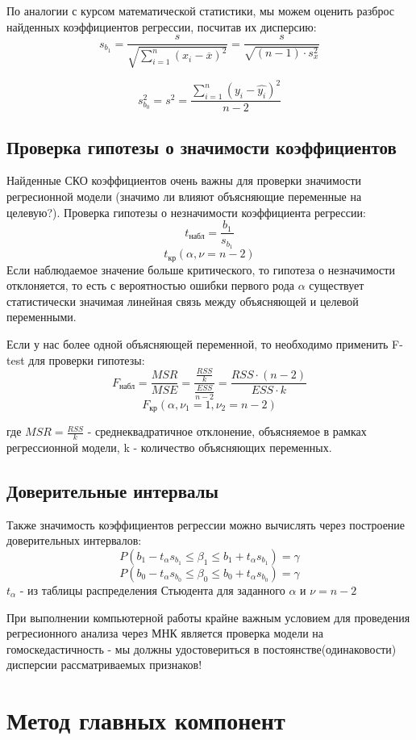 \documentclass[a4paper,12pt]{article} %
\begin{document}
По аналогии с курсом математической статистики, мы можем оценить разброс найденных коэффициентов регрессии, посчитав их дисперсию:
\[s_{b_1}=\frac{s}{\sqrt{\sum\limits_{i=1}^n (x_i-\overline{x})^2}} = \frac{s}{\sqrt{(n-1)\cdot s_x^2}}\]

\[s_{b_0}^2=s^2=\frac{\sum\limits_{i=1}^n (y_i-\hat{y_i})^2}{n-2}\]

\subsection{Проверка гипотезы о значимости коэффициентов}
Найденные СКО коэффициентов очень важны для проверки значимости регресионной модели (значимо ли влияют объясняющие переменные на целевую?). Проверка гипотезы о незначимости коэффициента регрессии:
\[t_{\text{набл}}=\frac{b_1}{s_{b_1}}\]
\[t_{\text{кр}}(\alpha, \nu=n-2)\]
Если наблюдаемое значение больше критического, то гипотеза о незначимости отклоняется, то есть с вероятностью ошибки первого рода $\alpha$ существует статистически значимая линейная связь между объясняющей и целевой переменными.

Если у нас более одной объясняющей переменной, то необходимо применить F-test для проверки гипотезы:
\[F_{\text{набл}}=\frac{MSR}{MSE}=\frac{\frac{RSS}{k}}{\frac{ESS}{n-2}}=\frac{RSS \cdot (n-2)}{ESS \cdot k}\]
\[F_{\text{кр}}(\alpha, \nu_1=1, \nu_2=n-2)\]

где $MSR=\frac{RSS}{k}$ - среднеквадратичное отклонение, объясняемое в рамках регрессионной модели, k - количество объясняющих переменных.

\subsection{Доверительные интервалы}

Также значимость коэффициентов регрессии можно вычислять через построение доверительных интервалов:
\[P(b_1-t_{\alpha}s_{b_1}\le \beta_1 \le b_1+t_{\alpha}s_{b_1})=\gamma\]
\[P(b_0-t_{\alpha}s_{b_0}\le \beta_0 \le b_0+t_{\alpha}s_{b_0})=\gamma\]
$t_{\alpha}$ - из таблицы распределения Стьюдента для заданного $\alpha$ и $\nu=n-2$

При выполнении компьютерной работы крайне важным условием для проведения регресионного анализа через МНК является проверка модели на гомоскедастичность - мы должны удостовериться в постоянстве(одинаковости) дисперсии рассматриваемых признаков!

\section{Метод главных компонент}
\end{document}
